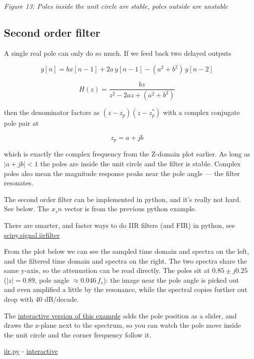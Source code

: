 {
\centering
{}
}

\emph{Figure 13: Poles inside the unit circle are stable, poles outside
are unstable}

\subsection{Second order filter}\label{second-order-filter}

A single real pole can only do so much. If we feed back two delayed
outputs

\[ y[n] = b x[n-1] + 2a\, y[n-1] - (a^2 + b^2)\, y[n-2] \]

\[ H(z) = \frac{b z}{z^2 - 2a z + (a^2+b^2)} \]

then the denominator factors as \((z - z_p)(z - z_p^*)\) with a complex
conjugate pole pair at

\[ z_p = a + jb \]

which is exactly the complex frequency from the Z-domain plot earlier.
As long as \(\vert a + jb\vert < 1\) the poles are inside the unit
circle and the filter is stable. Complex poles also mean the magnitude
response peaks near the pole angle --- the filter resonates.

The second order filter can be implemented in python, and it's really
not hard. See below. The \(x_sn\) vector is from the previous python
example.

There are smarter, and faster ways to do IIR filters (and FIR) in
python, see
\href{https://docs.scipy.org/doc/scipy/reference/generated/scipy.signal.iirfilter.html}{scipy.signal.iirfilter}

From the plot below we can see the sampled time domain and spectra on
the left, and the filtered time domain and spectra on the right. The two
spectra share the same y-axis, so the attenuation can be read directly.
The poles sit at \(0.85 \pm j0.25\) (\(\vert z\vert = 0.89\), pole angle
\(\approx 0.046\,f_s\)): the image near the pole angle is picked out and
even amplified a little by the resonance, while the spectral copies
further out drop with 40 dB/decade.

The
\href{https://wulffern.github.io/aic2026/assets/examples/iir.html}{interactive
version of this example} adds the pole position as a slider, and draws
the z-plane next to the spectrum, so you can watch the pole move inside
the unit circle and the corner frequency follow it.

\href{https://github.com/wulffern/aic2026/blob/main/ex/iir.py}{iir.py} -
\href{https://wulffern.github.io/aic2026/assets/examples/iir.html}{interactive}



